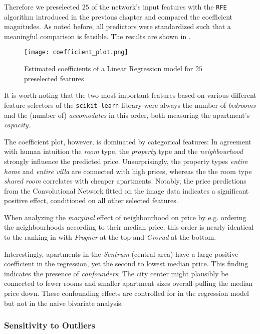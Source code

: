 Therefore we preselected $25$ of the network's input features with the \texttt{RFE} algorithm introduced in the previous chapter and compared the coefficient magnitudes.
As noted before, all predictors were standardized such that a meaningful comparison is feasible.
The results are shown in .

\begin{figure}[t]
  \centering
  \texttt{[image: coefficient\_plot.png]}
  \caption{Estimated coefficients of a Linear Regression model for $25$ preselected features}
  \label{fig:coefficient-plot}
\end{figure}

It is worth noting that the two most important features based on various different feature selectors of the \texttt{scikit-learn} library were always the number of \emph{bedrooms} and the (number of) \emph{accomodates} in this order, both measuring the apartment's \emph{capacity}.

The coefficient plot, however, is dominated by categorical features:
In agreement with human intuition the \emph{room} type, the \emph{property} type and the \emph{neighbourhood} strongly influence the predicted price.
Unsurprisingly, the property types \emph{entire home} and \emph{entire villa} are connected with high prices, whereas the the room type \emph{shared room} correlates with cheaper apartments.
Notably, the price predictions from the Convolutional Network fitted on the image data indicates a significant positive effect, conditioned on all other selected features.

When analyzing the \emph{marginal} effect of neighbourhood on price by e.g. ordering the neighbourhoods according to their median price, this order is nearly identical to the ranking in  with \emph{Frogner} at the top and \emph{Grorud} at the bottom.

Interestingly, apartments in the \emph{Sentrum} (central area) have a large positive coefficient in the regression, yet the second to lowest median price.
This finding indicates the presence of \emph{confounders}:
The city center might plausibly be connected to fewer rooms and smaller apartment sizes overall pulling the median price down.
These confounding effects are controlled for in the regression model but not in the naive bivariate analysis.


\subsubsection{Sensitivity to Outliers} \label{outliers}

